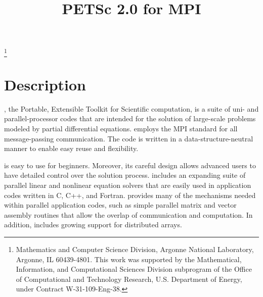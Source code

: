 \pagestyle{empty}

\pagestyle{empty}
\title{PETSc 2.0 for MPI}
\thanks{Mathematics and Computer Science Division,
Argonne National Laboratory,
Argonne, IL 60439-4801.
This work was supported by the Mathematical,
        Information, and Computational Sciences Division subprogram of
        the Office of Computational and Technology Research,
        U.S. Department of Energy, under Contract W-31-109-Eng-38.}

\date{}
\maketitle

\newcommand{\vsp}{\vspace{-1.5mm}}


\section*{Description}

, the Portable, Extensible Toolkit for Scientific computation,
is a suite of uni- and parallel-processor codes that are intended for
the solution of large-scale problems modeled by partial differential
equations.   employs the MPI standard for all
message-passing communication.  The code is written in a
data-structure-neutral manner to enable easy reuse and flexibility.

 is easy to use for beginners.  Moreover, its careful
design allows advanced users to have detailed control over the
solution process.  includes an expanding suite of parallel
linear and nonlinear equation solvers that are easily used in
application codes written in C, C++, and Fortran.  
provides many of the mechanisms needed within parallel application
codes, such as simple parallel matrix and vector assembly routines
that allow the overlap of communication and computation.  In addition,
 includes growing support for distributed arrays.

